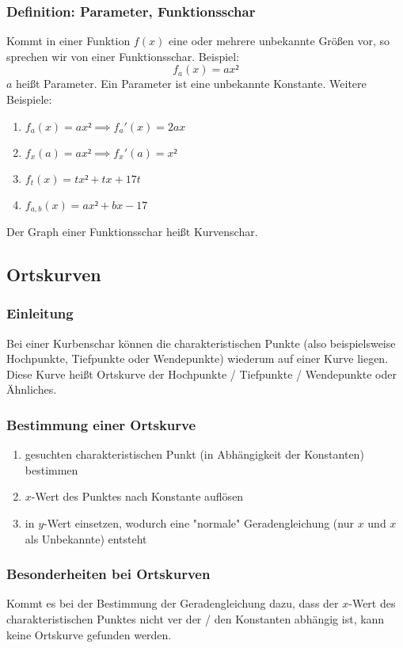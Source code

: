 \documentclass{article}
\begin{document}
  \subsubsection{Definition: Parameter, Funktionsschar}
  Kommt in einer Funktion $f(x)$ eine oder mehrere unbekannte Größen vor, so sprechen wir von einer Funktionsschar. Beispiel: 
  \begin{equation*}
  	f_a(x) = ax²
  \end{equation*}
  $a$ heißt Parameter. Ein Parameter ist eine unbekannte Konstante. Weitere Beispiele: 
  \begin{enumerate}
  	\item $f_a(x) = ax² \implies f_a'(x) = 2ax$
  	\item $f_x(a) = ax² \implies f_x'(a) = x²$
  	\item $f_t(x) = tx² + tx + 17t$
  	\item $f_{a, b}(x) = ax² + bx - 17$
  \end{enumerate}
  Der Graph einer Funktionsschar heißt Kurvenschar.
  
  \subsection{Ortskurven}
  
  \subsubsection{Einleitung}
  Bei einer Kurbenschar können die charakteristischen Punkte (also beispielsweise Hochpunkte, Tiefpunkte oder Wendepunkte) wiederum auf einer Kurve liegen. Diese Kurve heißt Ortskurve der Hochpunkte / Tiefpunkte / Wendepunkte oder Ähnliches. 
  
  \subsubsection{Bestimmung einer Ortskurve}
  \begin{enumerate}
  	\item gesuchten charakteristischen Punkt (in Abhängigkeit der Konstanten) bestimmen
  	\item $x$-Wert des Punktes nach Konstante auflösen
  	\item in $y$-Wert einsetzen, wodurch eine "normale" Geradengleichung (nur $x$ und $x$ als Unbekannte) entsteht 
  \end{enumerate}
  
  \subsubsection{Besonderheiten bei Ortskurven}
  Kommt es bei der Bestimmung der Geradengleichung dazu, dass der $x$-Wert des charakteristischen Punktes nicht ver der / den Konstanten abhängig ist, kann keine Ortskurve gefunden werden. 
  
\end{document}
